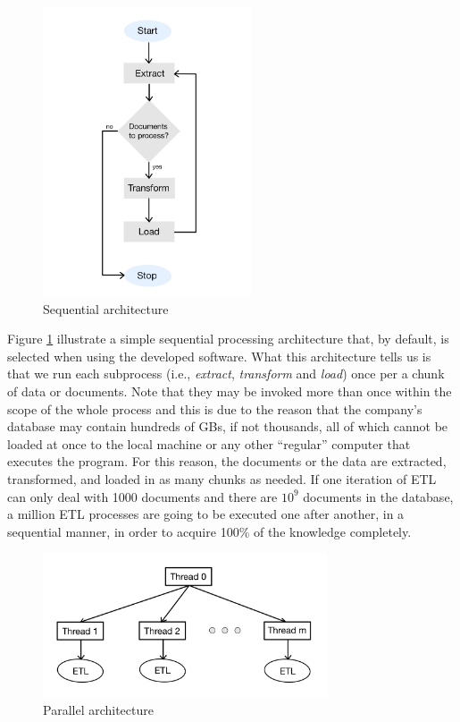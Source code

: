 \begin{figure}[H]
	\centering
	\includegraphics[width=0.55\textwidth]{../../resources/sequential_proc_arch.jpg}
	\caption{Sequential architecture}
	\label{fig:seq_arch}
\end{figure}

Figure \ref{fig:seq_arch} illustrate a simple sequential processing architecture that, by default, 
is selected when using the developed software. What this architecture tells us is that we run each 
subprocess (i.e., \textit{extract}, \textit{transform} and \textit{load}) once per a chunk of data or 
documents. Note that they may be invoked more than once within the scope of the whole process and 
this is due to the reason that the company's database may contain hundreds of GBs, if not thousands, 
all of which cannot be loaded at once to the local machine or any other ``regular'' computer that executes 
the program. For this reason, the documents or the data are extracted, transformed, and loaded in 
as many chunks as needed. If one iteration of ETL can only deal with 1000 documents and there are 
$10^9$ 
documents in the database, a million ETL processes are going to be executed one after another, in a 
sequential manner, in order to acquire 100\% of the knowledge completely.

\begin{figure}[H]
	\centering
	\includegraphics[width=0.75\textwidth]{../../resources/parallel_proc_arch.jpg}
	\caption{Parallel architecture}
	\label{fig:par_arch}
\end{figure}

